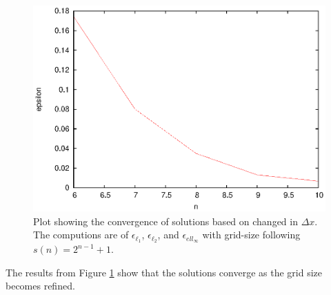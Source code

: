   \begin{figure}
    \centering
    \includegraphics{converge_spatial}
    \caption{Plot showing the convergence of solutions based on changed in $\Delta x$. The computions are of $\epsilon_{\ell_1}$, $\epsilon_{\ell_2}$, and $\epsilon_{ell_\infty}$ with grid-size following $s(n) = 2^{n-1}+1$.}
    \label{fig:converge_spatial}
  \end{figure}

  The results from Figure \ref{fig:converge_spatial} show that the solutions converge as the grid size becomes refined.


%
%
%
 
